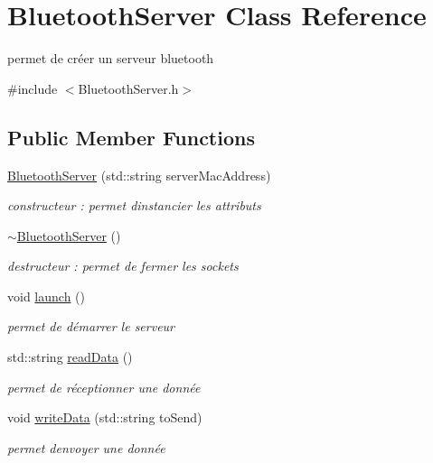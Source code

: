 \hypertarget{class_bluetooth_server}{}\section{Bluetooth\+Server Class Reference}
\label{class_bluetooth_server}


permet de créer un serveur bluetooth  




{\ttfamily \#include $<$Bluetooth\+Server.\+h$>$}

\subsection*{Public Member Functions}
\begin{DoxyCompactItemize}
\item 
\hyperlink{class_bluetooth_server_a8a33f843cb11c3d8bd1a1613bceeb963}{Bluetooth\+Server} (std\+::string server\+Mac\+Address)
\begin{DoxyCompactList}\small\item\em constructeur \+: permet d\textquotesingle{}instancier les attributs \end{DoxyCompactList}\item 
\hyperlink{class_bluetooth_server_ac664aa6e13215aacee09e560d28d5edf}{$\sim$\+Bluetooth\+Server} ()
\begin{DoxyCompactList}\small\item\em destructeur \+: permet de fermer les sockets \end{DoxyCompactList}\item 
void \hyperlink{class_bluetooth_server_a5e4e7348662fd1fd5f3aac54f2b73481}{launch} ()
\begin{DoxyCompactList}\small\item\em permet de démarrer le serveur \end{DoxyCompactList}\item 
std\+::string \hyperlink{class_bluetooth_server_a85d4d56d32b7aa99746b57784f1ebdbb}{read\+Data} ()
\begin{DoxyCompactList}\small\item\em permet de réceptionner une donnée \end{DoxyCompactList}\item 
void \hyperlink{class_bluetooth_server_a3c7deee96780cb1ca20e0debc3daafe6}{write\+Data} (std\+::string to\+Send)
\begin{DoxyCompactList}\small\item\em permet d\textquotesingle{}envoyer une donnée \end{DoxyCompactList}\end{DoxyCompactItemize}


